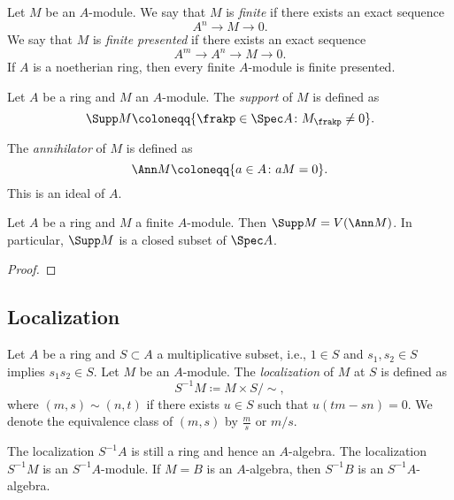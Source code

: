     Let \(M\) be an \(A\)-module.
    We say that \(M\) is \emph{finite} if there exists an exact sequence
    \[ A^n \to M \to 0. \]
    We say that \(M\) is \emph{finite presented} if there exists an exact sequence
    \[ A^m \to A^n \to M \to 0. \]
    If \(A\) is a noetherian ring, then every finite \(A\)-module is finite presented.

    \begin{definition}\label{def: support of a module}
        Let \(A\) be a ring and \(M\) an \(A\)-module.
        The \emph{support} of \(M\) is defined as
        \[
            \Supp M \coloneqq \{ \frakp \in \Spec A \colon M_\frakp \neq 0\}.
        \]
    \end{definition}

    The \emph{annihilator} of \(M\) is defined as
    \[ \Ann M \coloneqq \{ a \in A \colon aM = 0\}. \]
    This is an ideal of \(A\).

    \begin{proposition}\label{prop: support of a finite module}
        Let \(A\) be a ring and \(M\) a finite \(A\)-module.
        Then \(\Supp M = V(\Ann M)\).
        In particular, \(\Supp M\) is a closed subset of \(\Spec A\).
    \end{proposition}
    \begin{proof}
    \end{proof}

\subsection{Localization}

    \begin{definition}\label{def: localization}
        Let \(A\) be a ring and \(S \subset A\) a multiplicative subset, i.e., \(1 \in S\) and \(s_1,s_2 \in S\) implies \(s_1 s_2 \in S\).
        Let \(M\) be an \(A\)-module.
        The \emph{localization} of \(M\) at \(S\) is defined as
        \[ S^{-1}M \coloneqq M \times S / \sim, \]
        where \((m,s) \sim (n,t)\) if there exists \(u \in S\) such that \(u(tm - sn) = 0\).
        We denote the equivalence class of \((m,s)\) by \(\frac{m}{s}\) or \(m/s\).

        The localization \(S^{-1}A\) is still a ring and hence an \(A\)-algebra.
        The localization \(S^{-1}M\) is an \(S^{-1}A\)-module.
        If \(M=B\) is an \(A\)-algebra, then \(S^{-1}B\) is an \(S^{-1}A\)-algebra.
    \end{definition}

